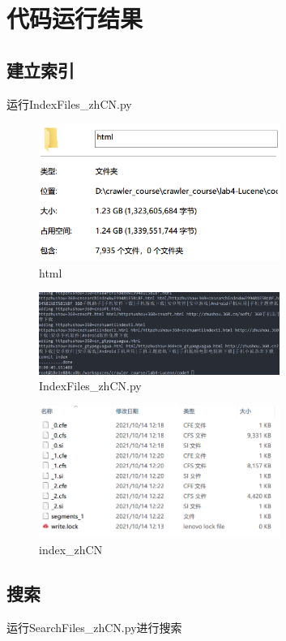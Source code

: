 \documentclass[12pt,a4paper]{article}
\begin{document}
\section{代码运行结果}
\subsection{建立索引}
运行IndexFiles{\_}zhCN.py
\begin{figure}[H]
	\includegraphics[width=0.7\textwidth]{htmls.png}
	\centering
	 \caption{html}
\end{figure}
\begin{figure}[H]
	\includegraphics[width=0.7\textwidth]{indexed.png}
	\centering
	 \caption{IndexFiles{\_}zhCN.py}
\end{figure}
\begin{figure}[H]
	\includegraphics[width=0.7\textwidth]{indexfolder.png}
	\centering
	 \caption{index{\_}zhCN}
\end{figure}



\subsection{搜索}
运行SearchFiles{\_}zhCN.py进行搜索
\end{document}
